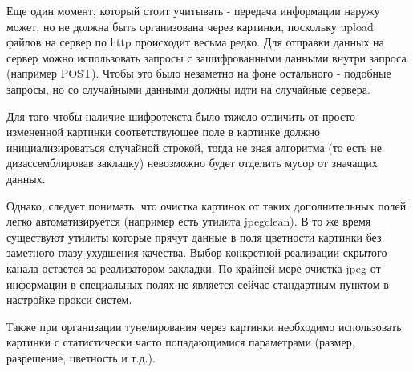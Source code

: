 Еще один момент, который стоит учитывать - передача информации наружу может,
но не должна быть организована через картинки, поскольку upload файлов на сервер
по http происходит весьма редко. Для отправки данных на сервер можно использовать
запросы с зашифрованными данными внутри запроса (например POST). Чтобы это было
незаметно на фоне остального - подобные запросы, но со случайными данными должны
идти на случайные сервера.

Для того чтобы наличие шифротекста было тяжело отличить от просто
измененной картинки соответствующее поле в картинке должно
инициализироваться случайной строкой, тогда не зная алгоритма (то есть
не дизассемблировав закладку) невозможно будет отделить мусор от значащих данных.

Однако, следует понимать, что очистка картинок от таких дополнительных
полей легко автоматизируется (например есть утилита jpegclean). В то же
время существуют утилиты которые прячут данные в поля цветности картинки
без заметного глазу ухудшения качества. Выбор конкретной реализации
скрытого канала остается за реализатором закладки. По крайней мере очистка
jpeg от информации в специальных полях не является сейчас стандартным пунктом
в настройке прокси систем.

Также при организации тунелирования через картинки необходимо использовать картинки
с статистически часто попадающимися параметрами (размер, разрешение, цветность и т.д.).
